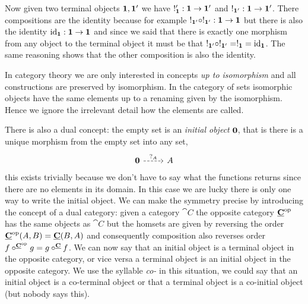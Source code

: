 Now given two terminal objects $\bf{1},\bf{1'}$ we have $!'_{\bf{1}} : \bf{1} \to \bf{1'}$ and $!_{\bf{1'}} : \bf{1} \to \bf{1'}$. There compositions are the identity because for example $!_{\bf{1'}} \circ !_{\bf{1'}} : \bf{1} \to \bf{1}$ but there is also the identity $\mathrm{id}_{\bf{1}} : \bf{1} \to \bf{1}$ and since we said that there is exactly one morphism from any object to the terminal object it must be that $!_{\bf{1'}} \circ !_{\bf{1'}} = !_{\bf{1}} = \mathrm{id}_{\bf{1}}$. The same reasoning shows that the other composition is also the identity.

In category theory we are only interested in concepts \emph{up to isomorphism} and all constructions are preserved by isomorphism. In the category of sets isomorphic objects have the same elements up to a renaming given by the isomorphism. Hence we ignore the irrelevant detail how the elements are called.

There is also a dual concept: the empty set is an \emph{initial object} $\bf{0}$, that is there is a unique morphism from the empty set into any set, 
\[\begin{tikzcd}
  \bf{0} \arrow[r, dashrightarrow, "?_A"] & A
\end{tikzcd}\]
this exists trivially because we don't have to say what the functions returns since there are no elements in its domain. In this case we are lucky there is only one way to write the initial object. We can make the symmetry precise by introducing the concept of a dual category: given a category $\cat{C}$ the opposite category $\underline{\mathbf{C}}^{\mathrm{op}}$ has the same objects as $\cat{C}$ but the homsets are given by reversing the order $\underline{\mathbf{C}}^{\mathrm{op}}(A,B) = \underline{\mathbf{C}}(B,A)$ and consequently composition also reverses order $f \circ^{\underline{\mathbf{C}}^{\mathrm{op}}} g = g \circ^{\underline{\mathbf{C}}} f$. We can now say that an initial object is a terminal object in the opposite category, or vice versa a terminal object is an initial object in the opposite 
category. We use the syllable \emph{co-} in this situation, we could say that an initial object is a co-terminal object or that a terminal object is a co-initial object (but nobody says this).

